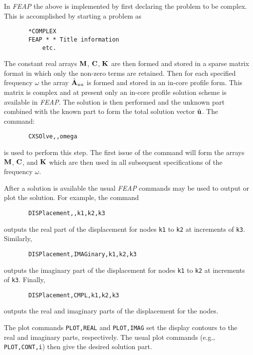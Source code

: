 In {\sl FEAP} the above is implemented by first declaring the problem to
be complex.  This is accomplished by starting a problem as
\begin{verbatim}
       *COMPLEX
       FEAP * * Title information
           etc.
\end{verbatim}
The constant real arrays ${\mathbf{M}}$, ${\mathbf{C}}$, ${\mathbf{K}}$ are then
formed and stored
in a sparse matrix format in which only the non-zero terms are retained.
Then for each specified frequency $\omega$ the array $\hat{\mathbf{A}}_{uu}$
is formed and stored in an in-core profile form.  This matrix is complex and at present only an in-core
profile solution scheme is available in {\sl FEAP}.  The solution
is then performed and the unknown part combined with the known part to
form the total solution vector $\hat{\mathbf{u}}$.  The command:
\begin{verbatim}
       CXSOlve,,omega
\end{verbatim}
is used to perform this step.  The first issue of the command will form
the arrays $\mathbf{M}$, $\mathbf{C}$, and $\mathbf{K}$ which are then used in all subsequent
specifications of the frequency $\omega$.

After a solution is available the usual {\sl FEAP} commands may be used
to output or plot the solution.  For example, the command
\begin{verbatim}
       DISPlacement,,k1,k2,k3
\end{verbatim}
outputs the real part of the displacement for nodes {\tt k1} to {\tt k2} at
increments of {\tt k3}.  Similarly,
\begin{verbatim}
       DISPlacement,IMAGinary,k1,k2,k3
\end{verbatim}
outputs the imaginary part of the displacement for nodes {\tt k1} to {\tt k2} at
increments of {\tt k3}.  Finally,
\begin{verbatim}
       DISPlacement,CMPL,k1,k2,k3
\end{verbatim}
outputs the real and imaginary parts of the displacement for the nodes.

The plot commands {\tt PLOT,REAL} and {\tt PLOT,IMAG} set the display
contours to the real and imaginary parts, respectively.  The usual plot
commands (e.g., {\tt PLOT,CONT,i}) then give the desired solution part. 
